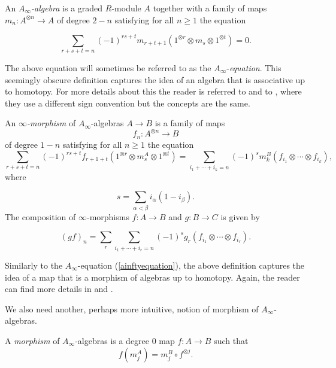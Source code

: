 \documentclass[Thesis.tex]{subfiles}
\begin{document}
\begin{defin}\label{ainftyalgebra}
An \emph{$A_\infty$-algebra} is a graded $R$-module $A$ together with a family of maps $m_n:A^{\otimes n}\to A$ of degree $2-n$ satisfying for all $n\geq 1$ the equation

\begin{equation}\label{ainftyequation}
\sum_{r+s+t=n}(-1)^{rs+t}m_{r+t+1}(1^{\otimes r}\otimes m_s\otimes 1^{\otimes t})=0.
\end{equation}
\end{defin}
The above equation will sometimes be referred to as the $A_\infty$-\emph{equation}. This seemingly obscure definition captures the idea of an algebra that is associative up to homotopy. For more details about this the reader is referred to \cite{keller} and to \cite[\S 9.2]{lodayvallette}, where they use a different sign convention but the concepts are the same.

\begin{defin}\label{inftymorphism}
An \emph{$\infty$-morphism} of $A_\infty$-algebras $A\to B$ is a family of maps \[f_n:A^{\otimes n}\to B\] of degree $1-n$ satisfying for all $n\geq 1$ the equation
\[\sum_{r+s+t=n} (-1)^{rs+t}f_{r+1+t}(1^{\otimes r} \otimes m^A_s\otimes 1^{\otimes t})=\sum_{i_1+\cdots+i_k=n} (-1)^s m^B_k(f_{i_1}\otimes\cdots\otimes f_{i_k}),\]
where

\[s=\sum_{\alpha<\beta}i_\alpha(1-i_\beta).\]
The composition of $\infty$-morphisms $f:A\to B$ and  $g:B\to C$ is given by 

\[(gf)_n=\sum_r\sum_{i_1+\cdots+i_r=n}(-1)^s g_r(f_{i_1}\otimes\cdots
\otimes f_{i_r}).\]
\end{defin}

Similarly to the $A_\infty$-equation (\cref{ainftyequation}), the above definition captures the idea of a map that is a morphism of algebras up to homotopy. Again, the reader can find more details in \cite{keller} and \cite[\S 9.2]{lodayvallette}.

We also need another, perhaps more intuitive, notion of morphism of $A_\infty$-algebras.

\begin{defin}\label{inftyalgebramorphism}
A \emph{morphism} of $A_\infty$-algebras is a degree 0 map $f:A\to B$ such that
\[f(m^A_j)=m^B_j\circ f^{\otimes j}.\]
\end{defin}
\end{document}
